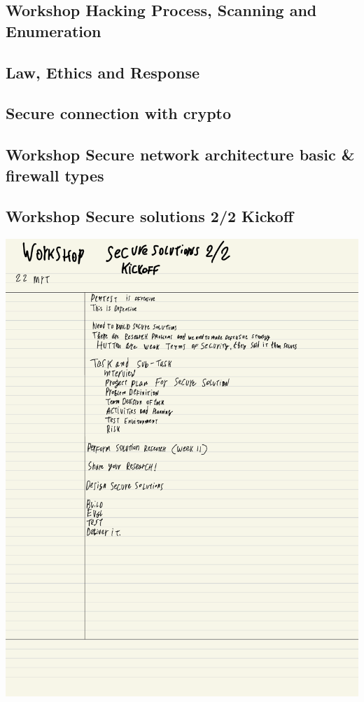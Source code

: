 \documentclass[12pt, letterpaper]{article}
\begin{document}
\subsection{Workshop Hacking Process, Scanning and Enumeration}

\newpage
\subsection{Law, Ethics and Response}


\newpage
\subsection{Secure connection with crypto}

\newpage
\subsection{Workshop Secure network architecture basic \& firewall types}

\newpage
\subsection{Workshop Secure solutions 2/2 Kickoff}
\includegraphics{PDFs/Week 6/Workshop Notes kickoff.pdf}
\newpage
\end{document}
